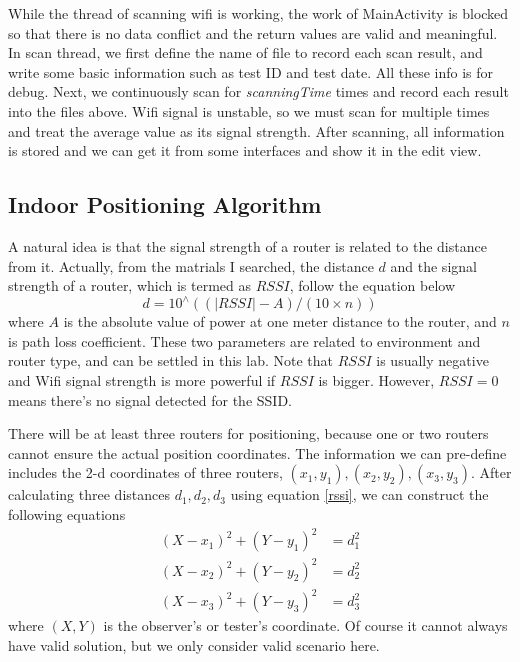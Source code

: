 \documentclass{article}
\begin{document}
While the thread of scanning wifi is working, the work of MainActivity is blocked so that there is no data conflict and the return values are valid and meaningful. In scan thread, we first define the name of file to record each scan result, and write some basic information such as test ID and test date. All these info is for debug. Next, we continuously scan for \textit{scanningTime} times and record each result into the files above. Wifi signal is unstable, so we must scan for multiple times and treat the average value as its signal strength. After scanning, all information is stored and we can get it from some interfaces and show it in the edit view.

\subsection{Indoor Positioning Algorithm}
A natural idea is that the signal strength of a router is related to the distance from it. Actually, from the matrials I searched, the distance $d$ and the signal strength of a router, which is termed as $RSSI$, follow the equation below
\begin{equation} \label{rssi}
     d = 10 ^\wedge ((|RSSI|-A)/(10\times n))
\end{equation}
where $A$ is the absolute value of power at one meter distance to the router, and $n$ is path loss coefficient. These two parameters are related to environment and router type, and can be settled in this lab. Note that $RSSI$ is usually negative and Wifi signal strength is more powerful if $RSSI$ is bigger. However, $RSSI=0$ means there's no signal detected for the SSID.

There will be at least three routers for positioning, because one or two routers cannot ensure the actual position coordinates. The information we can pre-define includes the 2-d coordinates of three routers, $(x_1, y_1),(x_2,y_2),(x_3,y_3)$. After calculating three distances $d_1, d_2,d_3$ using equation \ref{rssi}, we can construct the following equations
\begin{equation} \label{distance}
\begin{aligned}
     (X-x_1)^2+(Y-y_1)^2&=d_1^2 \\
     (X-x_2)^2+(Y-y_2)^2&=d_2^2 \\
     (X-x_3)^2+(Y-y_3)^2&=d_3^2
\end{aligned}
\end{equation}
where $(X,Y)$ is the observer's or tester's coordinate. Of course it cannot always have valid solution, but we only consider valid scenario here.
\end{document}
